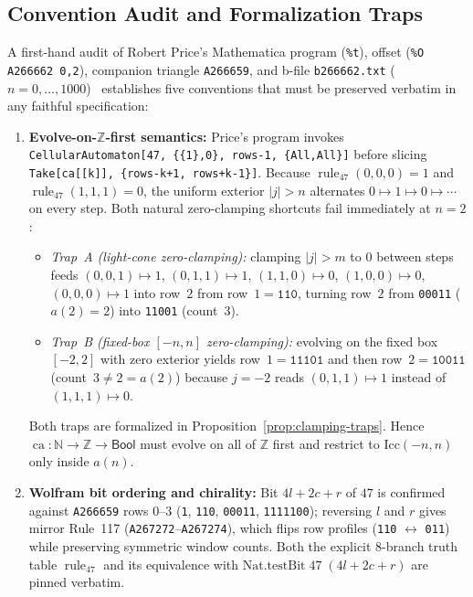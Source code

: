 \documentclass[11pt]{article}
\theoremstyle{definition}
\newcommand{\N}{\mathbb{N}}
\newcommand{\Z}{\mathbb{Z}}
\newcommand{\seq}[1]{\texttt{#1}}
\newcommand{\ruleFS}{\operatorname{rule}_{47}}
\newcommand{\ca}{\operatorname{ca}}
\begin{document}
\subsection{Convention Audit and Formalization Traps}
\label{sec:conventions}

A first-hand audit of Robert Price's Mathematica program (\texttt{\%t}), offset (\texttt{\%O A266662 0,2}), companion triangle \seq{A266659}, and b-file \texttt{b266662.txt} ($n = 0, \dots, 1000$)~\cite{oeis266662} establishes five conventions that must be preserved verbatim in any faithful specification:
\begin{enumerate}
\item \textbf{Evolve-on-$\Z$-first semantics:} Price's program invokes \texttt{CellularAutomaton[47, \{\{1\},0\}, rows-1, \{All,All\}]} before slicing \texttt{Take[ca[[k]], \{rows-k+1, rows+k-1\}]}. Because $\ruleFS(0,0,0) = 1$ and $\ruleFS(1,1,1) = 0$, the uniform exterior $|j| > n$ alternates $0 \mapsto 1 \mapsto 0 \mapsto \cdots$ on every step. Both natural zero-clamping shortcuts fail immediately at $n = 2$:
\begin{itemize}
\item \emph{Trap~A (light-cone zero-clamping):} clamping $|j| > m$ to $0$ between steps feeds $(0,0,1) \mapsto 1$, $(0,1,1) \mapsto 1$, $(1,1,0) \mapsto 0$, $(1,0,0) \mapsto 0$, $(0,0,0) \mapsto 1$ into row~$2$ from row~$1 = \mathtt{110}$, turning row~$2$ from \texttt{00011} ($a(2) = 2$) into \texttt{11001} (count~$3$).
\item \emph{Trap~B (fixed-box $[-n, n]$ zero-clamping):} evolving on the fixed box $[-2, 2]$ with zero exterior yields row~$1 = \mathtt{11101}$ and then row~$2 = \mathtt{10011}$ (count~$3 \ne 2 = a(2)$) because $j = -2$ reads $(0, 1, 1) \mapsto 1$ instead of $(1, 1, 1) \mapsto 0$.
\end{itemize}
Both traps are formalized in Proposition~\ref{prop:clamping-traps}. Hence $\ca : \N \to \Z \to \mathsf{Bool}$ must evolve on all of $\Z$ first and restrict to $\mathrm{Icc}(-n, n)$ only inside $a(n)$.
\item \textbf{Wolfram bit ordering and chirality:} Bit $4l + 2c + r$ of $47$ is confirmed against \seq{A266659} rows $0\text{--}3$ (\texttt{1}, \texttt{110}, \texttt{00011}, \texttt{1111100}); reversing $l$ and $r$ gives mirror Rule~117 (\seq{A267272}--\seq{A267274}), which flips row profiles (\texttt{110} $\leftrightarrow$ \texttt{011}) while preserving symmetric window counts. Both the explicit $8$-branch truth table $\ruleFS$ and its equivalence with $\mathrm{Nat.testBit}\;47\;(4l + 2c + r)$ are pinned verbatim.

\end{enumerate}
\end{document}
